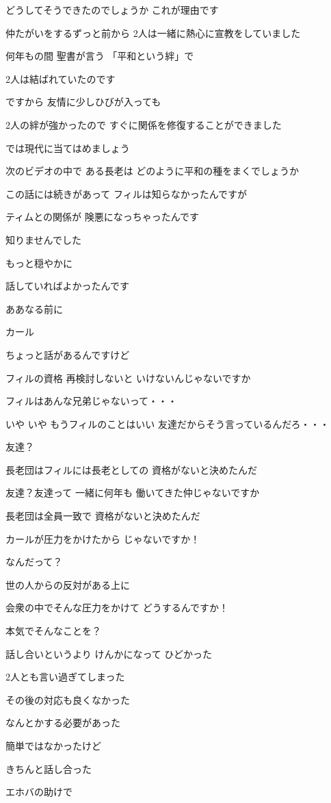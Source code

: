 \documentclass[twocolumn]{jsarticle}
\begin{document}
どうしてそうできたのでしょうか
これが理由です

仲たがいをするずっと前から
2人は一緒に熱心に宣教をしていました

何年もの間 聖書が言う
「平和という絆」で

2人は結ばれていたのです

ですから 友情に少しひびが入っても

2人の絆が強かったので
すぐに関係を修復することができました

では現代に当てはめましょう

次のビデオの中で ある長老は
どのように平和の種をまくでしょうか

この話には続きがあって
フィルは知らなかったんですが

ティムとの関係が
険悪になっちゃったんです

知りませんでした

もっと穏やかに

話していればよかったんです

ああなる前に

カール

ちょっと話があるんですけど

フィルの資格 再検討しないと
いけないんじゃないですか

フィルはあんな兄弟じゃないって・・・

いや いや もうフィルのことはいい
友達だからそう言っているんだろ・・・

友達？

長老団はフィルには長老としての
資格がないと決めたんだ

友達？友達って 一緒に何年も
働いてきた仲じゃないですか

長老団は全員一致で
資格がないと決めたんだ

カールが圧力をかけたから
じゃないですか！

なんだって？

世の人からの反対がある上に

会衆の中でそんな圧力をかけて
どうするんですか！

本気でそんなことを？

話し合いというより
けんかになって ひどかった

2人とも言い過ぎてしまった

その後の対応も良くなかった

なんとかする必要があった

簡単ではなかったけど

きちんと話し合った

エホバの助けで
\end{document}
